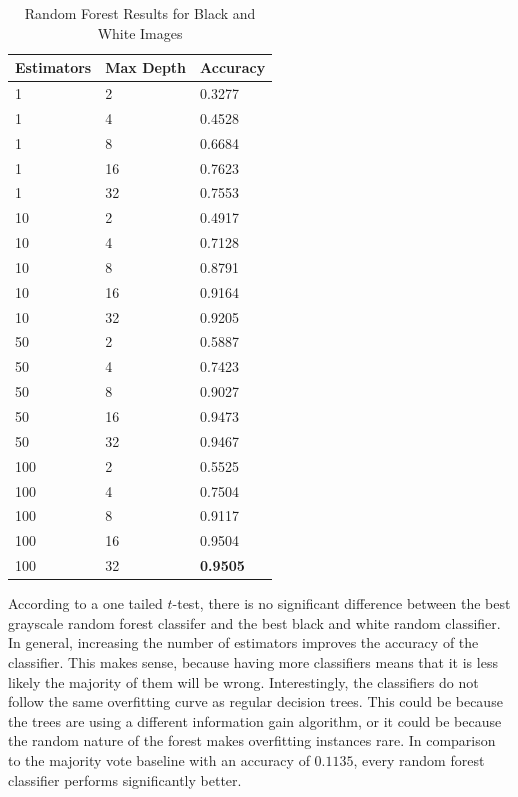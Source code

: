 \documentclass[12pt]{article}
\begin{document}
\begin{table}[H]
\centering
\caption{Random Forest Results for Black and White Images}
    \begin{tabular}{|l|l|l|}
    \hline
    Estimators & Max Depth & Accuracy \\ \hline
    1          & 2         & 0.3277   \\ \hline
    1          & 4         & 0.4528   \\ \hline
    1          & 8         & 0.6684   \\ \hline
    1          & 16        & 0.7623   \\ \hline
    1          & 32        & 0.7553   \\ \hline
    10         & 2         & 0.4917   \\ \hline
    10         & 4         & 0.7128   \\ \hline
    10         & 8         & 0.8791   \\ \hline
    10         & 16        & 0.9164   \\ \hline
    10         & 32        & 0.9205   \\ \hline
    50         & 2         & 0.5887   \\ \hline
    50         & 4         & 0.7423   \\ \hline
    50         & 8         & 0.9027   \\ \hline
    50         & 16        & 0.9473   \\ \hline
    50         & 32        & 0.9467   \\ \hline
    100        & 2         & 0.5525    \\ \hline
    100        & 4         & 0.7504   \\ \hline
    100        & 8         & 0.9117   \\ \hline
    100        & 16        & 0.9504   \\ \hline
    100        & 32        & \textbf{0.9505}   \\ \hline
    \end{tabular}
\end{table}

According to a one tailed $t$-test, there is no significant difference between the best grayscale random forest classifer and the best black and white random classifier. In general, increasing the number of estimators improves the accuracy of the classifier. This makes sense, because having more classifiers means that it is less likely the majority of them will be wrong. Interestingly, the classifiers do not follow the same overfitting curve as regular decision trees. This could be because the trees are using a different information gain algorithm, or it could be because the random nature of the forest makes overfitting instances rare. In comparison to the majority vote baseline with an accuracy of $0.1135$, every random forest classifier performs significantly better.
\end{document}
